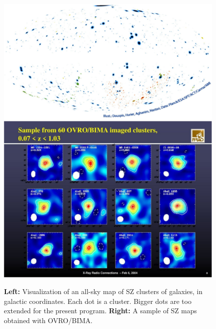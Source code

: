 \documentclass[11pt,a4paper,twoside,graphicx,color]{article}
\begin{document}
\begin{figure}[b]
  \begin{center}
\includegraphics[width=0.45\columnwidth]{./Figures/Cat_all_colors_cr_DouspisEtAlCrop.pdf}
   \includegraphics[width=0.45\columnwidth]{./Figures/slide_8crop.pdf}
  \end{center}
\caption{{\bf Left:} Visualization of an all-sky map of SZ clusters of galaxies, in galactic coordinates. Each dot is a cluster. Bigger dots are too extended for the present program. {\bf Right: } A sample of SZ maps obtained with OVRO/BIMA. \cite{Reese2002}}

\label{Fig:AllSky}
\end{figure}


\end{document}
